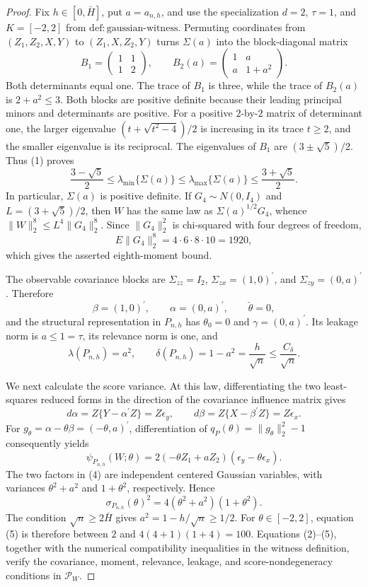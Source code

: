 \documentclass{article}
\begin{document}
\begin{proof}
Fix \(h\in[0,\bar H]\), put \(a=a_{n,h}\), and use the specialization \(d=2\), \(\tau=1\), and \(K=[-2,2]\) from \(\mathrm{def:gaussian\mbox{-}witness}\). Permuting coordinates from \((Z_1,Z_2,X,Y)\) to \((Z_1,X,Z_2,Y)\) turns \(\Sigma(a)\) into the block-diagonal matrix
\[
 B_1=\begin{pmatrix}1&1\\1&2\end{pmatrix},
 \qquad
 B_2(a)=\begin{pmatrix}1&a\\a&1+a^2\end{pmatrix}. \tag{1}
\]
Both determinants equal one. The trace of \(B_1\) is three, while the trace of \(B_2(a)\) is \(2+a^2\leq3\). Both blocks are positive definite because their leading principal minors and determinants are positive. For a positive \(2\)-by-\(2\) matrix of determinant one, the larger eigenvalue \((t+\sqrt{t^2-4})/2\) is increasing in its trace \(t\geq2\), and the smaller eigenvalue is its reciprocal. The eigenvalues of \(B_1\) are \((3\pm\sqrt5)/2\). Thus (1) proves
\[
 \frac{3-\sqrt5}{2}\leq\lambda_{\min}\{\Sigma(a)\}
 \leq\lambda_{\max}\{\Sigma(a)\}\leq\frac{3+\sqrt5}{2}. \tag{2}
\]
In particular, \(\Sigma(a)\) is positive definite. If \(G_4\sim N(0,I_4)\) and \(L=(3+\sqrt5)/2\), then \(W\) has the same law as \(\Sigma(a)^{1/2}G_4\), whence \(\|W\|_2^8\leq L^4\|G_4\|_2^8\). Since \(\|G_4\|_2^2\) is chi-squared with four degrees of freedom,
\[
 E\|G_4\|_2^8=4\cdot6\cdot8\cdot10=1920,
\]
which gives the asserted eighth-moment bound.

The observable covariance blocks are \(\Sigma_{zz}=I_2\), \(\Sigma_{zx}=(1,0)^{\prime}\), and \(\Sigma_{zy}=(0,a)^{\prime}\). Therefore
\[
 \beta=(1,0)^{\prime},\qquad
 \alpha=(0,a)^{\prime},\qquad
 \check\theta=0,
\]
and the structural representation in \(P_{n,h}\) has \(\theta_0=0\) and \(\gamma=(0,a)^{\prime}\). Its leakage norm is \(a\leq1=\tau\), its relevance norm is one, and
\[
 \lambda(P_{n,h})=a^2,
 \qquad
 \delta(P_{n,h})=1-a^2=\frac{h}{\sqrt n}
 \leq\frac{C_\delta}{\sqrt n}. \tag{3}
\]

We next calculate the score variance. At this law, differentiating the two least-squares reduced forms in the direction of the covariance influence matrix gives
\[
 d\alpha=Z\{Y-\alpha^{\prime}Z\}=Z\epsilon_y,
 \qquad
 d\beta=Z\{X-\beta^{\prime}Z\}=Z\epsilon_x.
\]
For \(g_\theta=\alpha-\theta\beta=(-\theta,a)^{\prime}\), differentiation of \(q_P(\theta)=\|g_\theta\|_2^2-1\) consequently yields
\[
 \psi_{P_{n,h}}(W;\theta)
 =2(-\theta Z_1+aZ_2)(\epsilon_y-\theta\epsilon_x). \tag{4}
\]
The two factors in (4) are independent centered Gaussian variables, with variances \(\theta^2+a^2\) and \(1+\theta^2\), respectively. Hence
\[
 \sigma_{P_{n,h}}(\theta)^2
 =4(\theta^2+a^2)(1+\theta^2). \tag{5}
\]
The condition \(\sqrt n\geq2\bar H\) gives \(a^2=1-h/\sqrt n\geq1/2\). For \(\theta\in[-2,2]\), equation (5) is therefore between \(2\) and \(4(4+1)(1+4)=100\). Equations (2)--(5), together with the numerical compatibility inequalities in the witness definition, verify the covariance, moment, relevance, leakage, and score-nondegeneracy conditions in \(\mathcal P_W\).


\end{proof}
\end{document}
